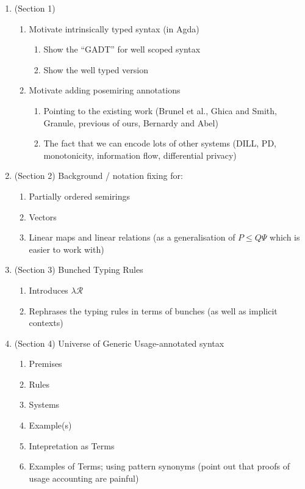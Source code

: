 \documentclass[sigplan,10pt,anonymous,review]{acmart}
\begin{document}
\begin{enumerate}
\item (Section 1)
  \begin{enumerate}
  \item   Motivate intrinsically typed syntax (in Agda)
    \begin{enumerate}
    \item Show the ``GADT'' for well scoped syntax
    \item Show the well typed version
    \end{enumerate}
  \item Motivate adding posemiring annotations
    \begin{enumerate}
    \item Pointing to the existing work (Brunel et al., Ghica and Smith, Granule, previous of ours, Bernardy and Abel)
    \item The fact that we can encode lots of other systems (DILL, PD, monotonicity, information flow, differential privacy)
    \end{enumerate}
  \end{enumerate}
\item (Section 2) Background / notation fixing for:
  \begin{enumerate}
  \item Partially ordered semirings
  \item Vectors
  \item Linear maps and linear relations (as a generalisation of $P \leq Q\Psi$ which is easier to work with)
  \end{enumerate}
\item (Section 3) Bunched Typing Rules
  \begin{enumerate}
  \item Introduces $\lambda\mathcal{R}$
  \item Rephrases the typing rules in terms of bunches (as well as implicit contexts)
  \end{enumerate}
\item (Section 4) Universe of Generic Usage-annotated syntax
  \begin{enumerate}
  \item Premises
  \item Rules
  \item Systems
  \item Example(s)
  \item Intepretation as Terms
  \item Examples of Terms; using pattern synonyms (point out that proofs of usage accounting are painful)

\end{enumerate}
\end{enumerate}
\end{document}
